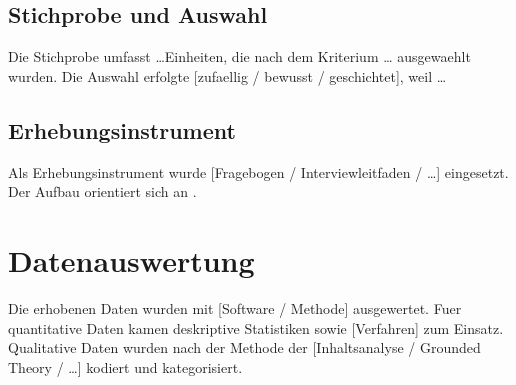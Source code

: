\subsection{Stichprobe und Auswahl}
\label{subsec:stichprobe}

Die Stichprobe umfasst \ldots Einheiten, die nach dem Kriterium \ldots
ausgewaehlt wurden. Die Auswahl erfolgte [zufaellig / bewusst / geschichtet],
weil \ldots

\subsection{Erhebungsinstrument}
\label{subsec:instrument}

Als Erhebungsinstrument wurde [Fragebogen / Interviewleitfaden / \ldots]
eingesetzt. Der Aufbau orientiert sich an \autocite{beispiel_artikel_2019}.

\section{Datenauswertung}
\label{sec:auswertung}

Die erhobenen Daten wurden mit [Software / Methode] ausgewertet.
Fuer quantitative Daten kamen deskriptive Statistiken sowie [Verfahren]
zum Einsatz. Qualitative Daten wurden nach der Methode der
[Inhaltsanalyse / Grounded Theory / \ldots] kodiert und kategorisiert.
